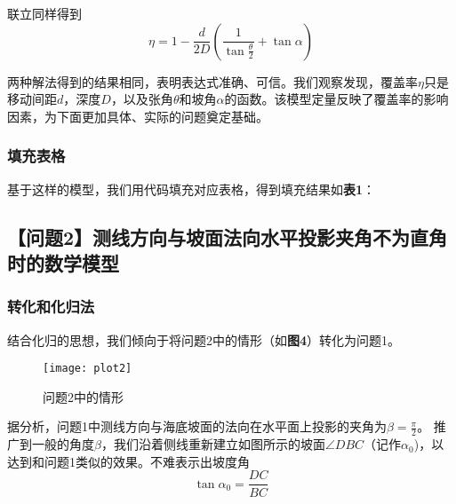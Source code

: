 \documentclass{cumcmthesis}
\begin{document}
联立同样得到 
\begin{equation}
\eta = 1 - \frac{d}{2D}(\frac{1}{\tan \frac{\theta}{2}}+\tan \alpha)
\label{eq:eq1-12}
\end{equation}

两种解法得到的结果相同，表明表达式准确、可信。我们观察发现，覆盖率$\eta$只是移动间距$d$，深度$D$，以及张角$\theta$和坡角$\alpha$的函数。该模型定量反映了覆盖率的影响因素，为下面更加具体、实际的问题奠定基础。

\subsubsection{填充表格}
基于这样的模型，我们用代码填充对应表格，得到填充结果如\textbf{表1}：
\begin{table}[!h]
\centering
\caption{问题 1 的计算结果}
\label{tab:my-table}
\end{table}
\subsection{【问题2】测线方向与坡面法向水平投影夹角不为直角时的数学模型}
\subsubsection{转化和化归法}
结合化归的思想，我们倾向于将问题2中的情形（如\textbf{图4}）转化为问题1。
\begin{figure}[!h]
    \centering
    \texttt{[image: plot2]}
    \caption{问题2中的情形}
    \label{fig:result1}
\end{figure}
据分析，问题1中测线方向与海底坡面的法向在水平面上投影的夹角为$\beta = \frac{\pi}{2}$。
推广到一般的角度$\beta$，我们沿着侧线重新建立如图所示的坡面$\angle DBC$（记作$\alpha_0$)，以达到和问题1类似的效果。不难表示出坡度角
\begin{equation}
\tan \alpha_0 = \frac{DC}{BC}
\label{eq:eq2-1}
\end{equation}
\end{document}
